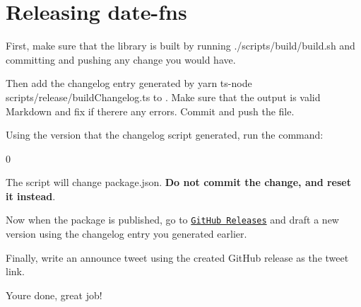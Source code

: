 \chapter{Releasing date-\/fns }
\hypertarget{md_frontend_2node__modules_2date-fns_2docs_2release}{}\label{md_frontend_2node__modules_2date-fns_2docs_2release}
\label{md_frontend_2node__modules_2date-fns_2docs_2release_autotoc_md6364}%
%



\begin{DoxyEnumerate}
\item First, make sure that the library is built by running {\ttfamily ./\+scripts/\+build/\+build.sh} and committing and pushing any change you would have.
\item Then add the changelog entry generated by {\ttfamily yarn ts-\/node scripts/\+release/\+build\+Changelog.\+ts} to . Make sure that the output is valid Markdown and fix if there\textquotesingle{}re any errors. Commit and push the file.
\item Using the version that the changelog script generated, run the command:\+


\begin{DoxyCode}{0}

\end{DoxyCode}


The script will change {\ttfamily package.\+json}. {\bfseries{Do not commit the change, and reset it instead}}.
\item Now when the package is published, go to \href{https://github.com/date-fns/date-fns/releases}{\texttt{Git\+Hub Releases}} and draft a new version using the changelog entry you generated earlier.
\item Finally, write an announce tweet using the created Git\+Hub release as the tweet link.
\end{DoxyEnumerate}

You\textquotesingle{}re done, great job! 